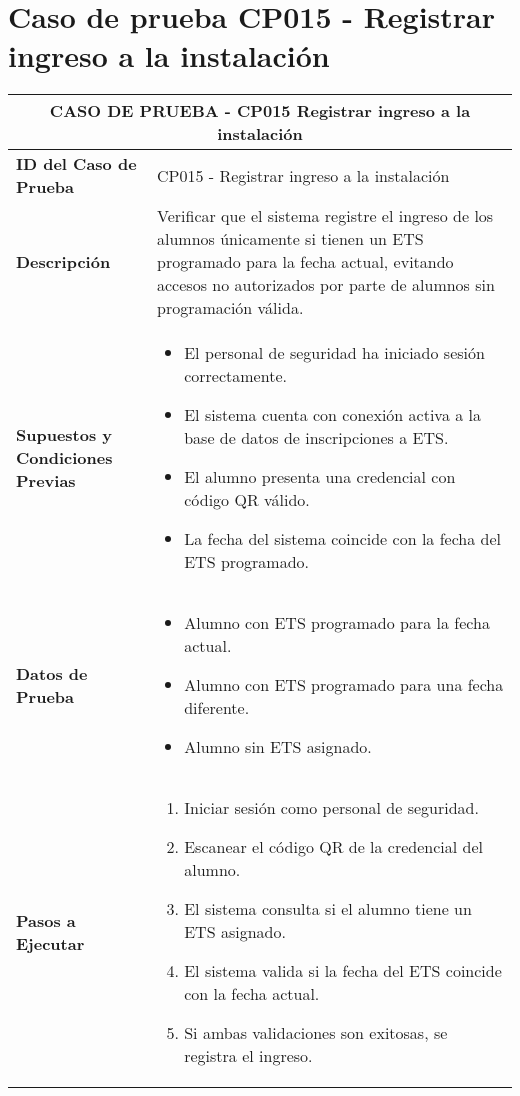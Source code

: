 \section{Caso de prueba CP015 - Registrar ingreso a la instalación}

\begin{longtable}{|p{5cm}|p{10cm}|}
	\hline \multicolumn{2}{|c|}{\textbf{CASO DE PRUEBA - CP015 Registrar ingreso a la instalación}} \\
	\hline \textbf{ID del Caso de Prueba} & CP015 - Registrar ingreso a la instalación \\
	\hline \textbf{Descripción} & Verificar que el sistema registre el ingreso de los alumnos únicamente si tienen un ETS programado para la fecha actual, evitando accesos no autorizados por parte de alumnos sin programación válida. \\
	\hline \textbf{Supuestos y Condiciones Previas} &
	\begin{itemize}
		\item El personal de seguridad ha iniciado sesión correctamente.
		\item El sistema cuenta con conexión activa a la base de datos de inscripciones a ETS.
		\item El alumno presenta una credencial con código QR válido.
		\item La fecha del sistema coincide con la fecha del ETS programado.
	\end{itemize} \\
	\hline \textbf{Datos de Prueba} &
	\begin{itemize}
		\item Alumno con ETS programado para la fecha actual.
		\item Alumno con ETS programado para una fecha diferente.
		\item Alumno sin ETS asignado.
	\end{itemize} \\
	\hline \textbf{Pasos a Ejecutar} &
	\begin{enumerate}
		\item Iniciar sesión como personal de seguridad.
		\item Escanear el código QR de la credencial del alumno.
		\item El sistema consulta si el alumno tiene un ETS asignado.
		\item El sistema valida si la fecha del ETS coincide con la fecha actual.
		\item Si ambas validaciones son exitosas, se registra el ingreso.

\end{enumerate}
\end{longtable}
